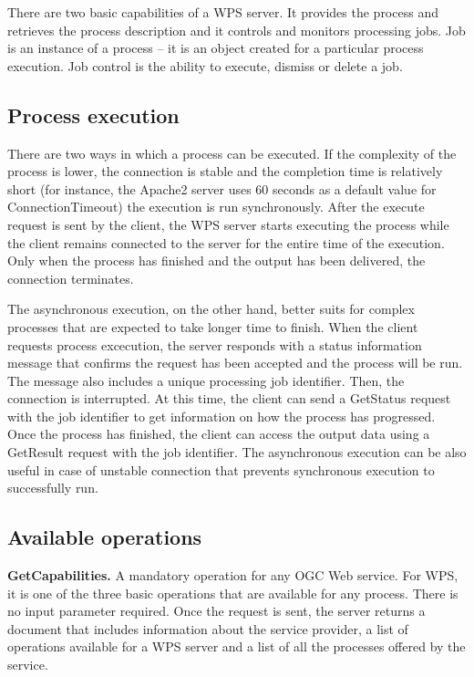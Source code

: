 There are two basic capabilities of a WPS server. It provides the
process and retrieves the process description and it controls and
monitors processing jobs. Job is an instance of a process – it is an
object created for a particular process execution. Job control is the
ability to execute, dismiss or delete a job.

\subsection{Process execution}


There are two ways in which a process can be executed. If the
complexity of the process is lower, the connection is stable and the
completion time is relatively short (for instance, the Apache2 server
uses 60 seconds as a default value for ConnectionTimeout\cite{apache})
the execution is run synchronously. After the execute request is sent
by the client, the WPS server starts executing the process while the
client remains connected to the server for the entire time of the
execution. Only when the process has finished and the output has been
delivered, the connection terminates.

The asynchronous execution, on the other hand, better suits for
complex processes that are expected to take longer time to
finish. When the client requests process excecution, the server
responds with a status information message that confirms the request
has been accepted and the process will be run. The message also
includes a unique processing job identifier. Then, the connection is
interrupted. At this time, the client can send a GetStatus request
with the job identifier to get information on how the process has
progressed. Once the process has finished, the client can access the
output data using a GetResult request with the job identifier. The
asynchronous execution can be also useful in case of unstable
connection that prevents synchronous execution to successfully run.

\subsection{Available operations}

\textbf{GetCapabilities.} A mandatory operation for any OGC Web
service. For WPS, it is one of the three basic operations that are
available for any process. There is no input parameter required. Once
the request is sent, the server returns a document that includes
information about the service provider, a list of operations available
for a WPS server and a list of all the processes offered by the
service.

